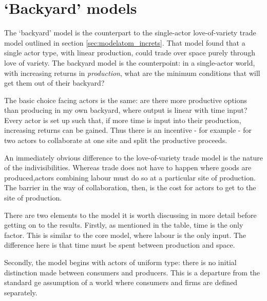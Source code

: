 \section{`Backyard' models \label{sec:backyard}}




The `backyard' model is the counterpart to the single-actor love-of-variety trade model outlined in section \ref{sec:modelatom_increts}. That model found that a single actor type, with linear production, could trade over space purely through love of variety. The backyard model is the counterpoint: in a single-actor world, with increasing returns in \emph{production}, what are the minimum conditions that will get them out of their backyard?

The basic choice facing actors is the same: are there more productive options than producing in my own backyard, where output is linear with time input? Every actor is set up such that, if more time is input into their production, increasing returns can be gained. Thus there is an incentive - for example - for two actors to collaborate at one site and split the productive proceeds. 

An immediately obvious difference to the love-of-variety trade model is the nature of the indivisibilities. Whereas trade does not have to happen where goods are produced,actors combining labour must do so at a particular site of production. The barrier in the way of collaboration, then, is the cost for actors to get to the site of production.




There are two elements to the model it is worth discussing in more detail before getting on to the results. Firstly, as mentioned in the table, time is the only factor.
This is similar to the core model, where labour is the only input. The difference here is that time must be spent between production and space.

Secondly, the model begins with actors of uniform type: there is no initial distinction made between consumers and producers. This is a departure from the standard \gls{ge} assumption of a world where consumers and firms are defined separately. 



